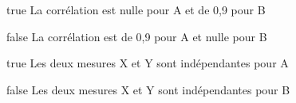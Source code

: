             \begin{reponses}
            	\item[true]  La corrélation est nulle pour A et de 0,9 pour B
            	\item[false] La corrélation est de 0,9 pour A et nulle pour B
                \item[true]  Les deux mesures X et Y sont indépendantes pour A
                \item[false] Les deux mesures X et Y sont indépendantes pour B
            \end{reponses}
